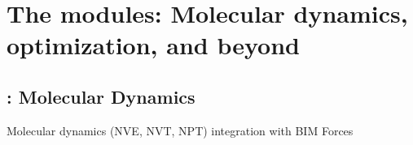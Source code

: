\documentclass[letterpaper,10pt,english]{sphinxmanual}
\begin{document}
\section{The  modules: Molecular dynamics, optimization, and beyond}
\label{\detokenize{drivers:the-drivers-modules-molecular-dynamics-optimization-and-beyond}}\label{\detokenize{drivers::doc}}

\subsection{: Molecular Dynamics}
\label{\detokenize{drivers:bim-md-molecular-dynamics}}\label{\detokenize{drivers:module-drivers.bim_md}}
Molecular dynamics (NVE, NVT, NPT) integration with BIM Forces
\end{document}
